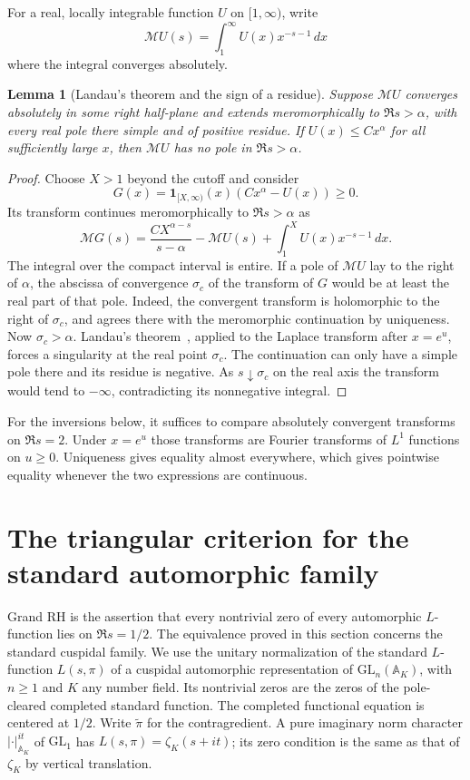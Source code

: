 \documentclass[11pt]{amsart}
\newtheorem{lemma}[theorem]{Lemma}
\theoremstyle{definition}
\theoremstyle{remark}
\numberwithin{equation}{section}
\begin{document}
For a real, locally integrable function \(U\) on \([1,\infty)\), write
\[
 \mathcal{M}U(s)=\int_1^\infty U(x)x^{-s-1}\,dx
\]
where the integral converges absolutely.

\begin{lemma}[Landau's theorem and the sign of a residue]
\label{lem:one-sided-mellin}
Suppose \(\mathcal{M}U\) converges absolutely in some right half-plane
and extends meromorphically to \(\Re s>\alpha\), with every real pole
there simple and of positive residue. If \(U(x)\le Cx^\alpha\) for
all sufficiently large \(x\), then \(\mathcal{M}U\) has no pole in
\(\Re s>\alpha\).
\end{lemma}

\begin{proof}
Choose \(X>1\) beyond the cutoff and consider
\[
 G(x)=\mathbf{1}_{[X,\infty)}(x)(Cx^\alpha-U(x))\geq0.
\]
Its transform continues meromorphically to \(\Re s>\alpha\) as
\[
 \mathcal{M}G(s)=\frac{C X^{\alpha-s}}{s-\alpha}
       -\mathcal{M}U(s)+\int_1^X U(x)x^{-s-1}\,dx.
\]
The integral over the compact interval is entire. If a pole of
\(\mathcal{M}U\) lay to the right of \(\alpha\), the abscissa of
convergence \(\sigma_c\) of the transform of \(G\) would be at least
the real part of that pole. Indeed, the convergent transform is
holomorphic to the right of \(\sigma_c\), and agrees there with the
meromorphic continuation by uniqueness. Now \(\sigma_c>\alpha\).
Landau's theorem~\cite{Landau1905}, applied to the Laplace transform
after \(x=e^u\), forces a singularity at the real point \(\sigma_c\).
The continuation can only have a simple pole there and its residue is
negative. As \(s\downarrow\sigma_c\) on the real axis the transform
would tend to \(-\infty\), contradicting its nonnegative integral.
\end{proof}

For the inversions below, it suffices to compare absolutely convergent
transforms on \(\Re s=2\). Under \(x=e^u\) those transforms are
Fourier transforms of \(L^1\) functions on \(u\geq0\). Uniqueness
gives equality almost everywhere, which gives pointwise equality
whenever the two expressions are continuous.

\section{The triangular criterion for the standard automorphic family}\label{sec:grand-research}

Grand RH is the assertion that every nontrivial zero of every
automorphic \(L\)-function lies on \(\Re s=1/2\). The equivalence
proved in this section concerns the standard cuspidal family.
We use the unitary normalization of the standard \(L\)-function
\(L(s,\pi)\) of a cuspidal automorphic representation of
\(\mathrm{GL}_n(\mathbb A_K)\), with \(n\geq1\) and \(K\) any number
field. Its nontrivial zeros are the zeros of the pole-cleared
completed standard function. The completed functional equation is
centered at \(1/2\). Write \(\widetilde{\pi}\) for the contragredient.
A pure imaginary norm character \(|\cdot|_{\mathbb A_K}^{it}\) of
\(\mathrm{GL}_1\) has \(L(s,\pi)=\zeta_K(s+it)\); its zero condition is
the same as that of \(\zeta_K\) by vertical translation.
\end{document}
